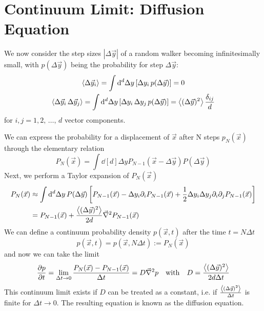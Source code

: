 \documentclass{notebook}
\begin{document}
\section{Continuum Limit: Diffusion Equation}

We now consider the step sizes $|\Delta \vec{y}|$ of a random walker becoming infinitesimally small, with $p(\Delta \vec{y})$ being the probability for step $\Delta \vec{y}$:
%
\begin{gather}
\expval{\Delta \vec{y}_i} = \int{\dd[d]{\Delta y} \left[ \Delta y_i \, p(\Delta \vec{y}) \right]} = 0 \\
\expval{\Delta \vec{y}_i \, \Delta \vec{y}_j} = \int{\dd[d]{\Delta y} \left[ \Delta y_i \, \Delta y_j \, p(\Delta \vec{y}) \right]} = \expval{(\Delta \vec{y})^2} \frac{\delta_{ij}}{d}
\end{gather}
%
for $i, j = 1, 2, \, \dots, \, d$ vector components.

We can express the probability for a displacement of $\vec{x}$ after N steps $p_N(\vec{x})$ through the elementary relation
%
\begin{equation}
P_N(\vec{x}) = \int{\dd[d]{\Delta y} P_{N-1}(\vec{x} - \Delta \vec{y}) P(\Delta \vec{y})}
\end{equation}
%
Next, we perform a Taylor expansion of $P_N(\vec{x})$
%
\begin{align*}
P_N(\vec{x}) &\approx \int{\dd[d]{\Delta y} P(\Delta \vec{y}) \left[ 
	P_{N-1}(\vec{x}) - \Delta y_i \partial_i P_{N-1}(\vec{x}) + \frac{1}{2}  \Delta y_i \Delta y_j \partial_i \partial_j P_{N-1}(\vec{x}) \right]} \\
&= P_{N-1}(\vec{x}) + \frac{\expval{(\Delta \vec{y})^2}}{2 d} \vec{\nabla}^2 P_{N-1}(\vec{x})	
\end{align*}
%
We can define a continuum probability density $p(\vec{x},t)$ after the time $t = N \Delta t$
%
\begin{equation}
p(\vec{x},t) = p(\vec{x}, N \Delta t) := P_N(\vec{x})
\end{equation}
%
and now we can take the limit
%
\begin{equation}
\pdv{p}{t} = \lim_{\Delta t \to 0} \frac{P_N(\vec{x}) - P_{N-1}(\vec{x})}{\Delta t} = D \vec{\nabla}^2 p \quad \mathrm{with} \quad D = \frac{\expval{(\Delta \vec{y})^2}}{2 d \Delta t}
\end{equation}
%
This continuum limit exists if $D$ can be treated as a constant, i.e. if $\frac{\expval{(\Delta \vec{y})^2}}{\Delta t}$ is finite for $\Delta t \to 0$. The resulting equation is known as the diffusion equation.
\end{document}
